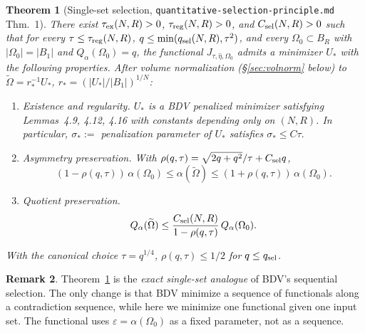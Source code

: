 \documentclass[11pt]{article}
\newtheorem{theorem}{Theorem}
\theoremstyle{definition}
\newtheorem{remark}[theorem]{Remark}
\newcommand{\abs}[1]{\left|#1\right|}
\begin{document}
\begin{theorem}[Single-set selection, \texttt{quantitative-selection-principle.md} Thm.~1]\label{thm:selection}
There exist $\tau_{\rm ex}(N,R)>0$, $\tau_{\rm reg}(N,R)>0$, and
$C_{\rm sel}(N,R)>0$ such that for every $\tau\le\tau_{\rm reg}(N,R)$,
$q\le\min(q_{\rm sel}(N,R),\tau^2)$, and every $\Omega_0\subset B_R$ with
$\abs{\Omega_0}=\abs{B_1}$ and $Q_\alpha(\Omega_0)=q$, the functional
$J_{\tau,\hat\eta,\Omega_0}$ admits a minimizer $U_*$ with the following
properties. After volume normalization (\S\ref{sec:volnorm} below) to
$\widetilde\Omega=r_*^{-1}U_*$, $r_*=(\abs{U_*}/\abs{B_1})^{1/N}$:
\begin{enumerate}
\item \emph{Existence and regularity.} $U_*$ is a BDV penalized minimizer
satisfying Lemmas~4.9, 4.12, 4.16 with constants depending only on
$(N,R)$. In particular, $\sigma_*:=$ penalization parameter of $U_*$
satisfies
\(
\sigma_*\le C\tau.
\)
\item \emph{Asymmetry preservation.} With
$\rho(q,\tau)=\sqrt{2q+q^2}/\tau+C_{\rm sel}q$,
\[
(1-\rho(q,\tau))\,\alpha(\Omega_0)
\le \alpha(\widetilde\Omega)
\le (1+\rho(q,\tau))\,\alpha(\Omega_0).
\]
\item \emph{Quotient preservation.}
\[
Q_\alpha(\widetilde\Omega)\le\frac{C_{\rm sel}(N,R)}{1-\rho(q,\tau)}\,Q_\alpha(\Omega_0).
\]
\end{enumerate}
With the canonical choice $\tau=q^{1/4}$, $\rho(q,\tau)\le1/2$ for
$q\le q_{\rm sel}$.
\end{theorem}

\begin{remark}
Theorem~\ref{thm:selection} is the \emph{exact single-set analogue} of BDV's
sequential selection. The only change is that BDV minimize a sequence of
functionals along a contradiction sequence, while here we minimize one
functional given one input set. The functional uses $\varepsilon=\alpha(\Omega_0)$
as a fixed parameter, not as a sequence.
\end{remark}
\end{document}
